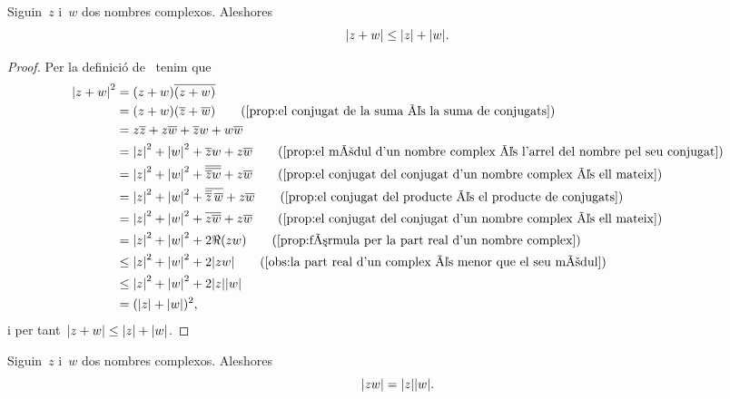 \documentclass[../Apunts.tex]{subfiles}
\begin{document}
	\begin{proposition}
		\label{prop:desigualta triangular nombres complexos}
		Siguin~\(z\) i~\(w\) dos nombres complexos.
		Aleshores
		\[\modul{z+w}\leq\modul{z}+\modul{w}.\]
	\end{proposition}
	\begin{proof}
		Per la definició de~ tenim que
		\begin{align*}
			\modul{z+w}^{2}&=(z+w)\conjugat{(z+w)} \\
			&=(z+w)(\conjugat{z}+\conjugat{w})
			\tag{\ref{prop:el conjugat de la suma és la suma de conjugats}} \\
			&=z\conjugat{z}+z\conjugat{w}+\conjugat{z}w+w\conjugat{w} \\
			&=\modul{z}^{2}+\modul{w}^{2}+\conjugat{z}w+z\conjugat{w}
			\tag{\ref{prop:el mòdul d'un nombre complex és l'arrel del nombre %
			pel seu conjugat}} \\
			&=\modul{z}^{2}+\modul{w}^{2}+\conjugat{\conjugat{\conjugat{z}w}}
			+z\conjugat{w} \tag{\ref{prop:el conjugat del conjugat d'un nombre %
			complex és ell mateix}} \\
			&=\modul{z}^{2}+\modul{w}^{2}+\conjugat{\conjugat{\conjugat{z}}\,
			\conjugat{w}}+z\conjugat{w} \tag{\ref{prop:el conjugat del %
			producte és el producte de conjugats}} \\
			&=\modul{z}^{2}+\modul{w}^{2}+\conjugat{z\conjugat{w}}+z\conjugat{w}
			\tag{\ref{prop:el conjugat del conjugat d'un nombre complex és %
			ell mateix}} \\
			&=\modul{z}^{2}+\modul{w}^{2}+2\Re(zw)
			\tag{\ref{prop:fórmula per la part real d'un nombre complex}} \\
			&\leq\modul{z}^{2}+\modul{w}^{2}+2\modul{zw}
			\tag{\ref{obs:la part real d'un complex és menor que el seu mòdul}}\\
			&\leq\modul{z}^{2}+\modul{w}^{2}+2\modul{z}\modul{w} \\
			&=(\modul{z}+\modul{w})^{2},
		\end{align*}
		i per tant~\(\modul{z+w}\leq\modul{z}+\modul{w}\).
	\end{proof}
	\begin{proposition}
		\label{prop:el producte de mòduls és el mòdul del producte}
		Siguin~\(z\) i~\(w\) dos nombres complexos.
		Aleshores
		\[\modul{zw}=\modul{z}\modul{w}.\]
	\end{proposition}
\end{document}

